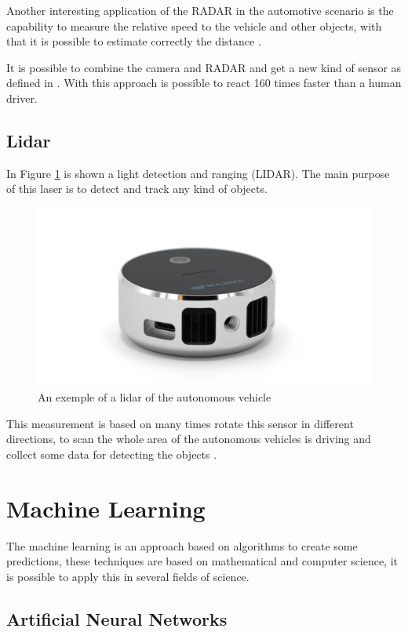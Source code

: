 Another interesting application of the RADAR in the automotive scenario is the capability to measure the relative speed to the vehicle and other objects, with that it is possible to estimate correctly the distance \cite{stevenson2011long}.

It is possible to combine the camera and RADAR and get a new kind of sensor as defined in \cite{kamerad}. With this approach is possible to react 160 times faster than a human driver.

\subsection{Lidar}
In Figure \ref{fig:lidar} is shown a light detection and ranging (LIDAR). The main purpose of this laser is to detect and track any kind of objects. 
\begin{figure}[H]
\centering
\includegraphics[width=\columnwidth]{imagens/lidar.jpg}
\caption{An exemple of a lidar of the autonomous vehicle}
\label{fig:lidar}
\end{figure}

This measurement is based on many times rotate this sensor in different directions, to scan the whole area of the autonomous vehicles is driving and collect some data for detecting the objects \cite{gao2018object}.

\section{Machine Learning}\label{ml-ai}
The machine learning is an approach based on algorithms to create some predictions, these techniques are based on mathematical and computer science, it is possible to apply this in several fields of science. 
\subsection{Artificial Neural Networks}

